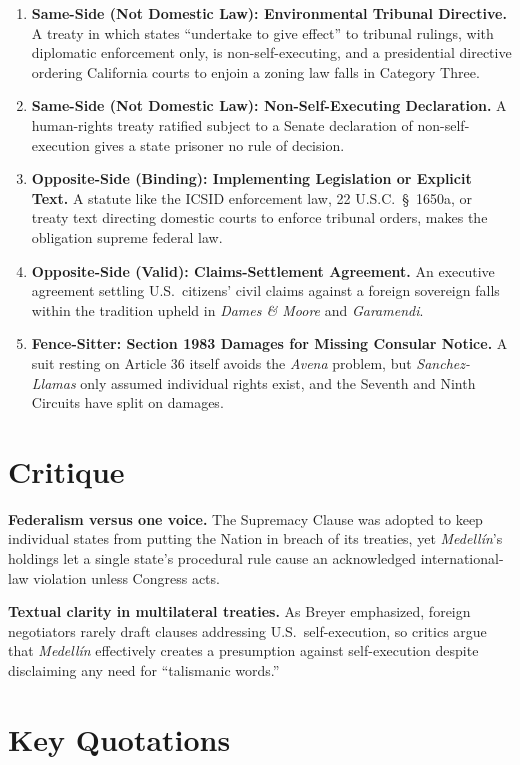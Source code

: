 \documentclass[12pt]{article}
\begin{document}
\begin{enumerate}
\item \textbf{Same-Side (Not Domestic Law): Environmental Tribunal Directive.} A treaty in which states ``undertake to give effect'' to tribunal rulings, with diplomatic enforcement only, is non-self-executing, and a presidential directive ordering California courts to enjoin a zoning law falls in Category Three.
\item \textbf{Same-Side (Not Domestic Law): Non-Self-Executing Declaration.} A human-rights treaty ratified subject to a Senate declaration of non-self-execution gives a state prisoner no rule of decision.
\item \textbf{Opposite-Side (Binding): Implementing Legislation or Explicit Text.} A statute like the ICSID enforcement law, 22 U.S.C.\ \S\ 1650a, or treaty text directing domestic courts to enforce tribunal orders, makes the obligation supreme federal law.
\item \textbf{Opposite-Side (Valid): Claims-Settlement Agreement.} An executive agreement settling U.S.\ citizens' civil claims against a foreign sovereign falls within the tradition upheld in \textit{Dames \& Moore} and \textit{Garamendi}.
\item \textbf{Fence-Sitter: Section 1983 Damages for Missing Consular Notice.} A suit resting on Article 36 itself avoids the \textit{Avena} problem, but \textit{Sanchez-Llamas} only assumed individual rights exist, and the Seventh and Ninth Circuits have split on damages.
\end{enumerate}

\section{Critique}

\textbf{Federalism versus one voice.} The Supremacy Clause was adopted to keep individual states from putting the Nation in breach of its treaties, yet \textit{Medell\'{i}n}'s holdings let a single state's procedural rule cause an acknowledged international-law violation unless Congress acts.

\textbf{Textual clarity in multilateral treaties.} As Breyer emphasized, foreign negotiators rarely draft clauses addressing U.S.\ self-execution, so critics argue that \textit{Medell\'{i}n} effectively creates a presumption against self-execution despite disclaiming any need for ``talismanic words.''

\section{Key Quotations}
\end{document}
